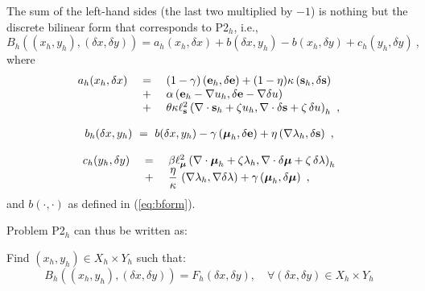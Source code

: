 The sum of the left-hand sides (the last two multiplied by $-1$) is nothing but the discrete bilinear form that corresponds to P2$_h$, i.e.,
\begin{equation}
B_h((x_h,y_h),(\delta x,\delta y))=a_h(x_h,\delta x)+b(\delta x,y_h)-b(x_h,\delta y)+c_h(y_h,\delta y)~,
\end{equation}
where
\begin{equation}
	\begin{array}{rcl}
		a_h(x_h,\delta x)~&=&~(1-\gamma)\left (\mathbf{e}_h,\delta \mathbf{e}\right )+(1-\eta)\kappa \left ( \mathbf{s}_h,\delta \mathbf{s} \right ) \\
		~&+&~\alpha \left( \mathbf{e}_h-\nabla u_h, \delta \mathbf{e} - \nabla \delta u \right)\\
		~&+&~ \theta \kappa \ell_{\mathbf{s}}^2  \left ( \nabla \cdot \mathbf{s}_h + \zeta u_h , \nabla \cdot \delta \mathbf{s} + \zeta \, \delta u \right )_h~,
	\end{array}
\end{equation}

\begin{equation}
	\begin{aligned}
		b_h(\delta x,y_h)~=~b(\delta x,y_h)-\gamma \left (\boldsymbol{\mu}_h,\delta \mathbf{e}\right )+\eta \left (\nabla \lambda_h,\delta \mathbf{s} \right ) ~,
	\end{aligned}
\end{equation}

\begin{equation}
	\begin{array}{rcl}
		c_h(y_h,\delta y) ~&=&~  \beta \ell_{\boldsymbol{\mu}}^2 \left ( \nabla \cdot \boldsymbol{\mu}_h + \zeta \lambda_h , \nabla \cdot \delta \boldsymbol{\mu} + \zeta\,\delta \lambda \right )_h \\
		~&+&~\dfrac{\eta}{\kappa}\,\left ( \nabla \lambda_h,\nabla \delta \lambda \right ) + \gamma \left ( \boldsymbol{\mu}_h,\delta \boldsymbol{\mu} \right )~,
	\end{array}
\end{equation}
and $b(\cdot,\cdot)$ as defined in (\ref{eq:bform}).

Problem P2$_h$ can thus be written as:

\begin{tcolorbox}[colback=black!10!white, boxrule=0pt, halign=justify]
	Find $(x_h,y_h)\in X_h \times Y_h$ such that:
	\begin{equation}
		B_h\left ( \left ( x_h,y_h \right ),\left ( \delta x,\delta y \right ) \right )= F_h(\delta x,\delta y), \quad \forall (\delta x, \delta y)\in X_h\times Y_h
		\label{eq:BzF}
	\end{equation}
\end{tcolorbox}

